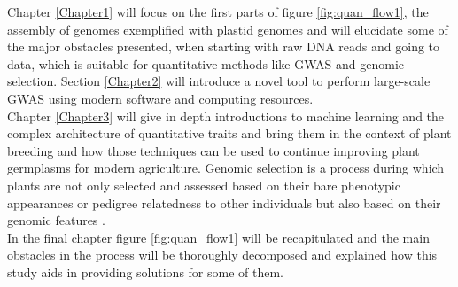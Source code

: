 Chapter \ref{Chapter1} will focus on the first parts of figure \ref{fig:quan_flow1}, the
assembly of genomes exemplified with plastid genomes and will elucidate some of the major
obstacles presented, when starting with raw DNA reads and going to data, which is suitable
for quantitative methods like GWAS and genomic selection. Section \ref{Chapter2} will
introduce a novel tool to perform large-scale GWAS using modern software and computing
resources. \\
Chapter \ref{Chapter3} will give in depth introductions to machine learning and the
complex architecture of quantitative traits and bring them in the context of plant
breeding and how those techniques can be used to continue improving plant germplasms for
modern agriculture. Genomic selection is a process during which plants are not only
selected and assessed based on their bare phenotypic appearances or pedigree relatedness
to other individuals but also based on their genomic features \cite{hayes2001}. \\
In the final chapter figure \ref{fig:quan_flow1} will be recapitulated and the main
obstacles in the process will be thoroughly decomposed and explained how this study aids
in providing solutions for some of them. 





